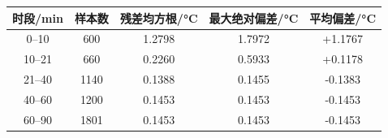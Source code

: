 \begin{tabular}{ccccc}
  \toprule
    时段/\si{min} & 样本数 & 残差均方根/\si{\celsius} & 最大绝对偏差/\si{\celsius} & 平均偏差/\si{\celsius} \\
  \midrule
    0--10 & 600 & 1.2798 & 1.7972 & +1.1767 \\
    10--21 & 660 & 0.2260 & 0.5933 & +0.1178 \\
    21--40 & 1140 & 0.1388 & 0.1455 & -0.1383 \\
    40--60 & 1200 & 0.1453 & 0.1453 & -0.1453 \\
    60--90 & 1801 & 0.1453 & 0.1453 & -0.1453 \\
  \bottomrule
\end{tabular}
